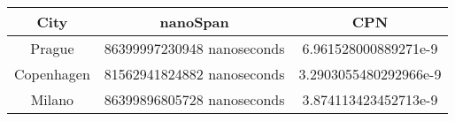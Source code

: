 \begin{tabular}{ccc}
\toprule
City & nanoSpan & CPN\\
\midrule
Prague & 86399997230948 nanoseconds & 6.961528000889271e-9\\
Copenhagen & 81562941824882 nanoseconds & 3.2903055480292966e-9\\
Milano & 86399896805728 nanoseconds & 3.874113423452713e-9\\
\bottomrule
\end{tabular}
